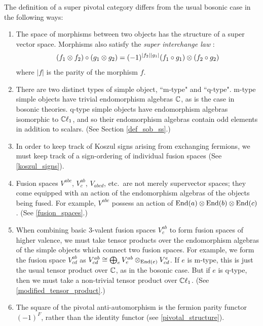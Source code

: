 The definition of a super pivotal category differs from the usual bosonic case in the following ways:

\begin{enumerate}
	\item The space of morphisms between two objects has the structure of 
	a super vector space.
	Morphisms also satisfy the {\em super interchange law} \cite{brundan2016}:
 
	\begin{align}
	(f_1\otimes f_2) \circ (g_1\otimes g_2) = (-1)^{|f_2| |g_1|} (f_1\circ g_1)\otimes (f_2\circ g_2)
	\end{align}
	where $|f|$ is the parity of the morphism $f$. 
	\item There are two distinct types of simple object, ``m-type" and ``q-type".
	m-type simple objects have trivial endomorphism algebras $\mathbb{C}$, as is the case in bosonic theories.  
	q-type simple objects have endomorphism algebras isomorphic to $\mathbb{C}\ell_1$, 
	and so their endomorphism algebras contain odd elements in addition to scalars. (See Section \ref{def_sob_ss}.)
	\item In order to keep track of Koszul signs arising from exchanging fermions, 
	we must keep track of a sign-ordering of individual fusion spaces (See \ref{koszul_signs}).
	\item Fusion spaces $V^{abc}$, $V^{ab}_c$, $V_{abcd}$, etc.\ are not merely supervector spaces; they come equipped with an action of the
	endomorphism algebras of the objects being fused. 
	For example, $V^{abc}$ possess an action of $\text{End}(a)\otimes \text{End}(b)\otimes \text{End}(c)$.
	(See \ref{fusion_spaces}.)
	\item When combining basic 3-valent fusion spaces $V^{ab}_c$ to form fusion spaces of higher valence, we must take
	tensor products over the endomorphism algebras of the simple objects which connect two fusion spaces. 
	For example, we form the fusion space $V^{ab}_{cd}$ as $V^{ab}_{cd} \cong \bigoplus_e V^{ab}_e \otimes_{\text{End}(e)} V^e_{cd}$.
	If $e$ is m-type, this is just the usual tensor product over $\mathbb{C}$, as in the bosonic case.
	But if $e$ is q-type, then we must take a non-trivial tensor product over $\mathbb{C}\ell_1$.
	(See \ref{modified_tensor_product}.)
	\item The square of the pivotal anti-automorphism is 
	the fermion parity functor $(-1)^F$, rather than the identity functor (see \ref{pivotal_structure}). 

\end{enumerate}
